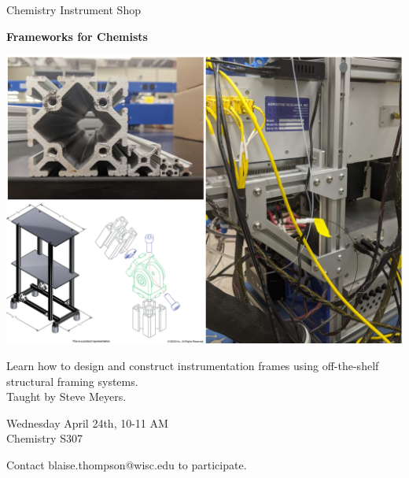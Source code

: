 \documentclass{article}
\begin{document}
\center

\Huge

Chemistry Instrument Shop

\textbf{
Frameworks for Chemists
}

\includegraphics[width=\linewidth]{coverart.png}

{
\huge
Learn how to design and construct instrumentation frames using off-the-shelf structural framing systems. \\
Taught by Steve Meyers.
}

\vfill

{
\huge
Wednesday April 24th, 10-11 AM \\
Chemistry S307
}

\vfill

{
\huge
Contact blaise.thompson@wisc.edu to participate.
}
\end{document}
